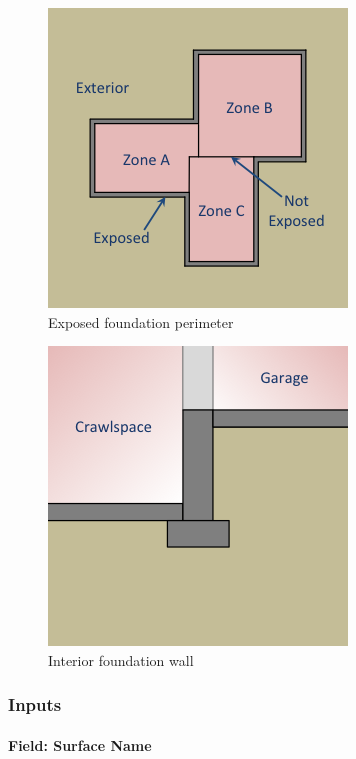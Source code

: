 \begin{figure}
\centering
\includegraphics{media/kiva-exposed-perim.png}
\caption{Exposed foundation perimeter\label{fig:ex}}
\end{figure}

\begin{figure}
\centering
\includegraphics{media/kiva-interior-fnd-wall.png}
\caption{Interior foundation wall\label{fig:ifw}}
\end{figure}

\subsubsection{Inputs}\label{surfaceproperty-exposedfoundationperimeter-inputs}

\paragraph{Field: Surface Name}\label{surfaceproperty-exposedfoundationperimeter-surface-name}

